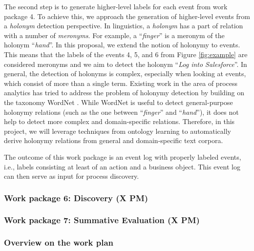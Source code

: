  The second step is to generate higher-level labels for each event from work package 4. To achieve this, we approach the generation of higher-level events from a \textit{holonym} detection perspective. In linguistics, a \textit{holonym} has a part of relation with a number of \textit{meronyms}. For example, a ``\textit{finger}'' is a meronym of the holonym ``\textit{hand}''. In this proposal, we extend the notion of holonymy to events. This means that the labels of the events 4, 5, and 6 from Figure \ref{fig:example} are considered meronyms and we aim to detect the holonym ``\textit{Log into Salesforce}''. In general, the detection of holonyms is complex, especially when looking at events, which consist of more than a single term. Existing work in the area of process analytics has tried to address the problem of holonymy detection by building on the taxonomy WordNet \cite{leopold2014simplifying}. While WordNet is useful to detect general-purpose holonymy relations (such as the one between ``\textit{finger}'' and ``\textit{hand}''), it does not help to detect more complex and domain-specific relations. Therefore, in this project, we will leverage techniques from ontology learning \cite{al2020automatic,wong2012ontology} to automatically derive holonymy relations from general and domain-specific text corpora.    

 The outcome of this work package is an event log with properly labeled events, i.e., labels consisting at least of an action and a business object. This event log can then serve as input for process discovery. 


\subsubsection{Work package 6: Discovery (X PM)}
\label{sec:wp6}

\subsubsection{Work package 7: Summative Evaluation (X PM)}
\label{sec:wp7}


\subsubsection{Overview on the work plan}

